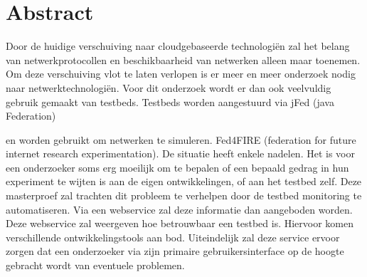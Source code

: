 \newpage
\chapter*{Abstract}
\npar
Door de huidige verschuiving naar cloudgebaseerde technologi\"en zal het belang 
van netwerkprotocollen en beschikbaarheid van netwerken alleen maar toenemen.
Om deze verschuiving vlot te laten verlopen is er meer en meer onderzoek nodig naar netwerktechnologi\"en.
Voor dit onderzoek wordt er dan ook veelvuldig gebruik gemaakt van testbeds.
Testbeds worden aangestuurd via jFed (java Federation)

en worden gebruikt om netwerken te simuleren. Fed4FIRE (federation for future internet research experimentation).
De situatie heeft enkele nadelen. Het is voor een onderzoeker soms erg moeilijk om te bepalen of een bepaald gedrag in hun experiment te wijten is aan de eigen ontwikkelingen, of aan het testbed zelf.
\npar
Deze masterproef zal trachten dit probleem te verhelpen door de testbed monitoring te automatiseren. Via een webservice zal deze informatie dan aangeboden worden. Deze webservice zal weergeven hoe betrouwbaar een testbed is. Hiervoor komen verschillende ontwikkelingstools aan bod. Uiteindelijk zal deze service ervoor zorgen dat een onderzoeker via zijn primaire gebruikersinterface op de hoogte gebracht wordt van eventuele problemen.